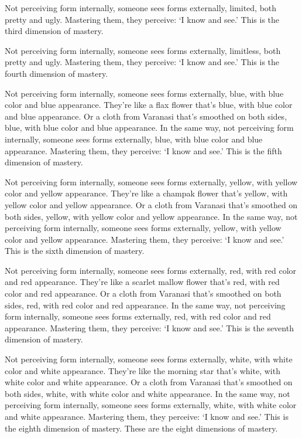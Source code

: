 \documentclass[12pt,openany]{book}%
\begin{document}
Not perceiving form internally, someone sees forms externally, limited, both pretty and ugly. Mastering them, they perceive: ‘I know and see.’ This is the third dimension of mastery. 

Not perceiving form internally, someone sees forms externally, limitless, both pretty and ugly. Mastering them, they perceive: ‘I know and see.’ This is the fourth dimension of mastery. 

Not perceiving form internally, someone sees forms externally, blue, with blue color and blue appearance. They’re like a flax flower that’s blue, with blue color and blue appearance. Or a cloth from Varanasi that’s smoothed on both sides, blue, with blue color and blue appearance. In the same way, not perceiving form internally, someone sees forms externally, blue, with blue color and blue appearance. Mastering them, they perceive: ‘I know and see.’ This is the fifth dimension of mastery. 

Not perceiving form internally, someone sees forms externally, yellow, with yellow color and yellow appearance. They’re like a champak flower that’s yellow, with yellow color and yellow appearance. Or a cloth from Varanasi that’s smoothed on both sides, yellow, with yellow color and yellow appearance. In the same way, not perceiving form internally, someone sees forms externally, yellow, with yellow color and yellow appearance. Mastering them, they perceive: ‘I know and see.’ This is the sixth dimension of mastery. 

Not perceiving form internally, someone sees forms externally, red, with red color and red appearance. They’re like a scarlet mallow flower that’s red, with red color and red appearance. Or a cloth from Varanasi that’s smoothed on both sides, red, with red color and red appearance. In the same way, not perceiving form internally, someone sees forms externally, red, with red color and red appearance. Mastering them, they perceive: ‘I know and see.’ This is the seventh dimension of mastery. 

Not perceiving form internally, someone sees forms externally, white, with white color and white appearance. They’re like the morning star that’s white, with white color and white appearance. Or a cloth from Varanasi that’s smoothed on both sides, white, with white color and white appearance. In the same way, not perceiving form internally, someone sees forms externally, white, with white color and white appearance. Mastering them, they perceive: ‘I know and see.’ This is the eighth dimension of mastery. These are the eight dimensions of mastery. 
\end{document}
